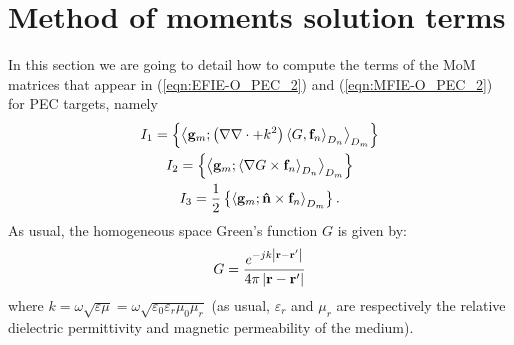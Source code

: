 \chapter{Method of moments solution terms}
\label{annex:MoM}

%
\par
In this section we are going to detail how to compute the terms of the MoM matrices that appear in (\ref{eqn:EFIE-O_PEC_2}) and (\ref{eqn:MFIE-O_PEC_2}) for PEC targets, namely
\begin{gather} 
I_1 = \left\{\left\langle \mathbf{g}_m ; \left(\nabla \nabla \cdot + k^2\right) \left\langle G , \mathbf{f}_n \right\rangle_{D_n} \right\rangle_{D_m}\right\}\label{eqn:MoM terms I_1} \\
I_2 = \left\{\left\langle \mathbf{g}_m ; \left\langle \nabla G \times \mathbf{f}_n \right\rangle_{D_n} \right\rangle_{D_m}\right\} \label{eqn:MoM terms I_2}\\
I_3 = \frac{1}{2} \left\{\left\langle \mathbf{g}_m ; \mathbf{\Hat{n}} \times \mathbf{f}_n \right\rangle_{D_m} \right\}. \label{eqn:MoM terms I_3}
\end{gather}
As usual, the homogeneous space Green's function $G$ is given by:
\begin{equation*}
G = \frac{e^{-jk\left|\mathbf{r}-\mathbf{r}' \right|}}{4 \pi \left|\mathbf{r}-\mathbf{r}' \right|}
\end{equation*}
where $k = \omega \sqrt{\varepsilon \mu} = \omega \sqrt{\varepsilon_0 \varepsilon_r \mu_0 \mu_r}$ (as usual, $\varepsilon_r$ and $\mu_r$ are respectively the relative dielectric permittivity and magnetic permeability of the medium).


